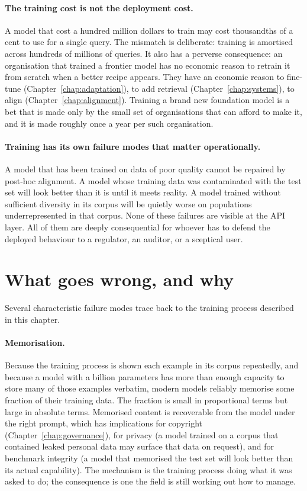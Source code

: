 \paragraph{The training cost is not the deployment cost.} A
model that cost a hundred million dollars to train may cost
thousandths of a cent to use for a single query. The mismatch is
deliberate: training is amortised across hundreds of millions
of queries. It also has a perverse consequence: an organisation
that trained a frontier model has no economic reason to retrain
it from scratch when a better recipe appears. They have an
economic reason to fine-tune (Chapter~\ref{chap:adaptation}), to add retrieval
(Chapter~\ref{chap:systems}), to align (Chapter~\ref{chap:alignment}). Training a brand new
foundation model is a bet that is made only by the small set of
organisations that can afford to make it, and it is made
roughly once a year per such organisation.

\paragraph{Training has its own failure modes that matter
operationally.} A model that has been trained on data of poor
quality cannot be repaired by post-hoc alignment. A model whose
training data was contaminated with the test set will look
better than it is until it meets reality. A model trained
without sufficient diversity in its corpus will be quietly
worse on populations underrepresented in that corpus. None of
these failures are visible at the API layer. All of them are
deeply consequential for whoever has to defend the deployed
behaviour to a regulator, an auditor, or a sceptical user.

\section{What goes wrong, and why}

Several characteristic failure modes trace back to the training
process described in this chapter.

\paragraph{Memorisation.} Because the training process is
shown each example in its corpus repeatedly, and because a
model with a billion parameters has more than enough capacity
to store many of those examples verbatim, modern models reliably
memorise some fraction of their training data. The fraction is
small in proportional terms but large in absolute terms.
Memorised content is recoverable from the model under the right
prompt, which has implications for copyright (Chapter~\ref{chap:governance}), for
privacy (a model trained on a corpus that contained leaked
personal data may surface that data on request), and for
benchmark integrity (a model that memorised the test set will
look better than its actual capability). The mechanism is the
training process doing what it was asked to do; the consequence
is one the field is still working out how to manage.

